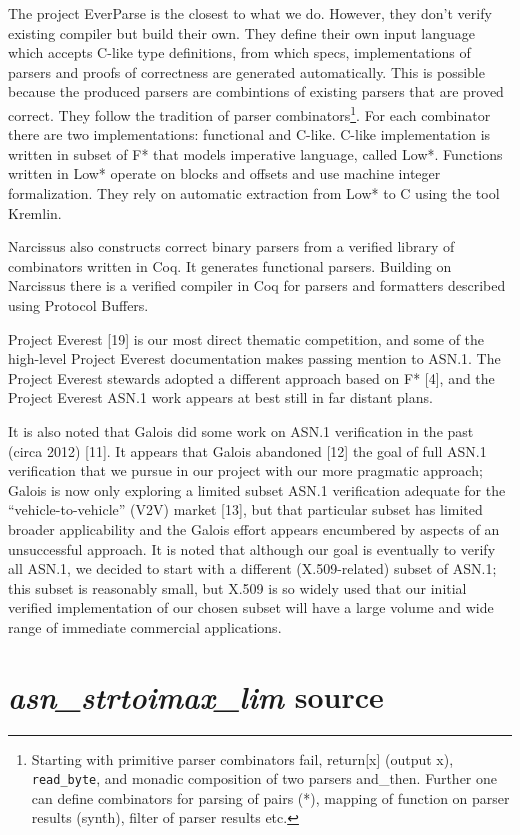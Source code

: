 \documentclass[acmsmall,nonacm]{acmart}
\begin{document}
The project EverParse is the closest to what we do. However, they don't verify existing compiler but build their own. They define their own input language which accepts C-like type definitions, from which specs, implementations of parsers and proofs of correctness are generated automatically. This is possible because the produced parsers are combintions of existing parsers that are proved correct. They follow the tradition of parser combinators\footnote{Starting with primitive parser combinators fail, return[x] (output x), \texttt{read\_byte}, and monadic composition of two parsers and\_then. Further one can define combinators for parsing of pairs (*), mapping of function on parser results (synth), filter of parser results etc.}. For each combinator there are two implementations: functional and C-like. C-like implementation is written in subset of F* that models imperative language, called Low*. Functions written in Low* operate on blocks and offsets and use machine integer formalization. They rely on automatic extraction from Low* to C using the tool Kremlin. 

Narcissus also constructs correct binary parsers from a
verified library of combinators written in Coq. It generates functional
parsers. Building on Narcissus there is a verified compiler in Coq for parsers
and formatters described using Protocol Buffers. 

 
  Project Everest [19] is our most direct thematic competition, and some of the high-level Project Everest documentation makes passing mention to ASN.1. The Project Everest stewards adopted a different approach based on F* [4], and the Project Everest ASN.1 work  appears at best still in far distant plans.

It is also noted that Galois did some work on ASN.1 verification in the past (circa 2012) [11]. It appears that Galois abandoned [12] the goal of full ASN.1 verification that we pursue in our project with our more pragmatic approach; Galois is now only exploring a limited subset ASN.1 verification adequate for the “vehicle-to-vehicle” (V2V) market [13], but that particular subset has limited broader applicability and the Galois effort appears encumbered by aspects of an unsuccessful  approach. It is noted that although our goal is eventually to verify all ASN.1, we decided to start with a different (X.509-related) subset of ASN.1; this subset is reasonably small, but X.509 is so widely used that our initial verified implementation of our chosen subset will have a large volume and wide range of immediate commercial applications.


\appendix
\clearpage
\section{\emph{asn\_strtoimax\_lim} source}
\label{sec:stritomax}

{\fontsize{8}{4}\selectfont  }



\end{document}
